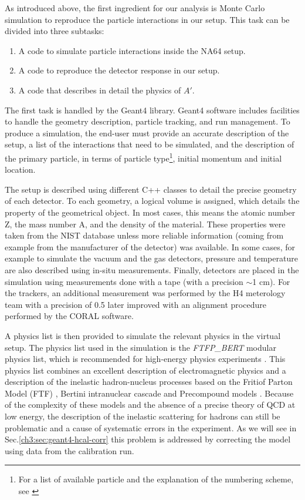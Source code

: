 As introduced above, the first ingredient for our analysis is Monte Carlo simulation to reproduce the particle interactions in our setup. This task can be divided into three subtasks:

\begin{enumerate}
\item A code to simulate particle interactions inside the NA64 setup.
\item A code to reproduce the detector response in our setup.  
\item A code that describes in detail the physics of $A'$.
\end{enumerate}

The first task is handled by the Geant4 library\cite{AGOSTINELLI2003250}. Geant4 software includes facilities to handle the geometry description, particle tracking, and run management. To produce a simulation, the end-user must provide an accurate description of the setup, a list of the interactions that need to be simulated, and the description of the primary particle, in terms of particle type\footnote{For a list of available particle and the explanation of the numbering scheme, see \cite{geant4-pdg}}, initial momentum and initial location.

The setup is described using different C++ classes to detail the precise geometry of each detector. To each geometry, a logical volume is assigned, which details the property of the geometrical object. In most cases, this means the atomic number Z, the mass number A, and the density of the material. These properties were taken from the NIST database \cite{nist-database} unless more reliable information (coming from example from the manufacturer of the detector) was available. In some cases, for example to simulate the vacuum and the gas detectors, pressure and temperature are also described using in-situ measurements. Finally, detectors are placed in the simulation using measurements done with a tape (with a precision $\sim$1 \si{\centi\meter}). For the trackers, an additional measurement was performed by the H4 meterology team with a precision of 0.5 \mmi\cite{meterology-measurements} later improved with an alignment procedure performed by the CORAL software\cite{ABBON2007455}. 

A physics list is then provided to simulate the relevant physics in the virtual setup. The physics list used in the simulation is the \textit{\textrm{FTFP\_BERT}} modular physics list, which is recommended for high-energy physics experiments \cite{ALLISON2016186}. This physics list combines an excellent description of electromagnetic physics and a description of the inelastic hadron-nucleus processes based on the Fritiof Parton Model (FTF) \cite{Uzhinsky:2013hea}, Bertini intranuclear cascade \cite{Heikkinen:2003sc} and Precompound models \cite{Apostolakis:2009zz}. Because of the complexity of these models and the absence of a precise theory of QCD at low energy, the description of the inelastic scattering for hadrons can still be problematic and a cause of systematic errors in the experiment. As we will see in Sec.\ref{ch3:sec:geant4-hcal-corr} this problem is addressed by correcting the model using data from the calibration run. 

